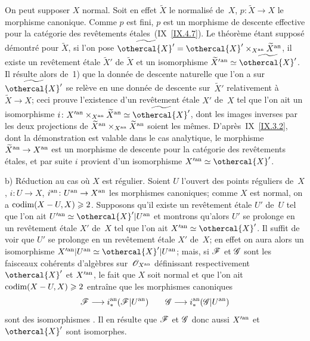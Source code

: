 On
peut supposer $X$ normal. Soit en effet $\widetilde{X}$ le
normalis\'e de~$X$, $p\colon\widetilde{X}\to X$ le morphisme
canonique. Comme $p$ est fini, $p$ est un morphisme de descente
effective pour la cat\'egorie des rev\^etements
\'etales~(IX~\ref{IX.4.7}). Le th\'eor\`eme \'etant
suppos\'e d\'emontr\'e pour $\widetilde{X}$, si l'on pose
$\widetilde{\othercal{X}'}=\othercal{X}'\times_{X^{\an}}\widetilde{X}^{\an}$,
il existe un rev\^etement \'etale $\widetilde{X}'$ de
$\widetilde{X}$ et un isomorphisme $\widetilde{X}'{}^{\an}\simeq
\widetilde{\othercal{X}'}$. Il r\'esulte alors de~1) que la donn\'ee
de descente naturelle que l'on a sur~$\widetilde{\othercal{X}'}$ se
rel\`eve en une donn\'ee de descente sur~$\widetilde{X}'$
relativement \`a $\widetilde{X}\to X$; ceci prouve l'existence d'un
rev\^etement \'etale $X'$ de~$X$ tel que l'on ait un isomorphisme
$i\colon X^{\prime\an}\times_{X^{\an}}\widetilde{X}^{\an} \simeq
\widetilde{\othercal{X}'}$, dont les images inverses par les deux
projections de
$\widetilde{X}^{\mathrm{an}}\times_{X^{\mathrm{an}}}\widetilde{X}^{\mathrm{an}}$ soient les
m\^emes. D'apr\`es~IX~\ref{IX.3.2}, dont la d\'emonstration est
valable dans le cas analytique, le morphisme $\widetilde{X}^{\an}\to
X^{\an}$ est un morphisme de descente pour la cat\'egorie des
rev\^etements \'etales, et par suite $i$ provient d'un
isomorphisme $X^{\prime\an}\simeq
\othercal{X}'$.

b) R\'eduction au cas o\`u $X$ est r\'egulier. Soient $U$
l'ouvert des points r\'eguliers de~$X$, $i\colon U\to X$,
$i^{\an}\colon U^{\an}\to X^{\an}$ les morphismes canoniques; comme
$X$ est normal, on a $\operatorname{codim}(X-U,X)\geqslant 2$. Supposons qu'il existe un
rev\^etement \'etale $U'$ de~$U$ tel que l'on ait
$U^{\prime\an}\simeq \othercal{X}'|U^{\an}$ et montrons qu'alors $U'$ se
prolonge en un rev\^etement \'etale $X'$ de~$X$ tel que l'on ait
$X^{\prime\an}\simeq \othercal{X}'$. Il suffit de voir que $U'$ se prolonge
en un rev\^etement \'etale $X'$ de~$X$; en effet on aura alors un
isomorphisme $X^{\prime\an}|U^{\an}\simeq \othercal{X}'|U^{\an}$; mais, si
$\cal{F}$ et $\cal{G}$ sont les faisceaux coh\'erents d'alg\`ebres
sur~$\cal{O}_{X^{\an}}$ d\'efinissant respectivement $\othercal{X}'$ et
$X^{\prime\mathrm{an}}$, le fait que $X$ soit normal et que l'on ait
$\operatorname{codim}(X-U,X)\geqslant 2$ entra\^ine que les morphismes canoniques
$$
\cal{F}\to i_*^{\an}(\cal{F}|U^{\an}) \qquad
\cal{G}\to i_*^{\an}(\cal{G}|U^{\an})
$$
sont
des isomorphismes \cite[~prop.\, 4]{XII.11}. Il en r\'esulte que $\cal{F}$
et $\cal{G}$ donc aussi $X^{\prime\mathrm{an}}$ et $\othercal{X}'$ sont isomorphes.

